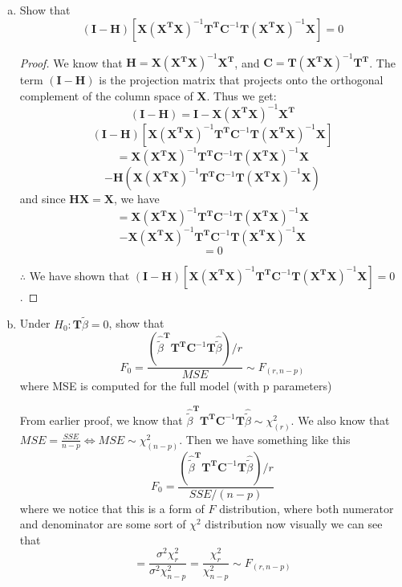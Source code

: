\documentclass[12pt]{article}
\newcommand{\X}{\mathbf{X}}
\newcommand{\btilde}{\tilde{\beta}}
\newcommand{\xtxinv}{(\X^{\T}\X)^{-1}}
\newcommand{\I}{\mathbf{I}}
\newcommand{\T}{\mathbf{T}}
\newcommand{\HM}{\mathbf{H}}
\begin{document}
\begin{enumerate}[1.]
\begin{enumerate}[a)]
\begin{proof}
                        $\therefore$ We have shown that 
                        $\hat{\btilde}^\T \T^\T \Sigma^{-1} \T \hat{\btilde} \sim \chi_{(\textbf{rank}(\textbf{T}))}^2 = \chi_{(r)}^2$.
                    \end{proof}
                    \item Show that 
                    \[(\I - \HM)[\X \xtxinv \T^\T \textbf{C}^{-1} \T \xtxinv \X] = 0\]

                    \begin{proof}
                        We know that $\HM = \X \xtxinv \X^\T$, and $\textbf{C} = \T (\X^\T \X)^{-1} \T^\T$. The term 
                        $(\I - \HM)$ is the projection matrix that projects onto 
                        the orthogonal complement of the column space of $\X$. Thus we get:
                        \[ (\I - \HM) = \I - \X \xtxinv \X^\T \]
                        \[ (\I - \HM)[\X \xtxinv \T^\T \textbf{C}^{-1} \T \xtxinv \X] \]
                        \[= \X \xtxinv \T^\T \textbf{C}^{-1} \T \xtxinv \X \]
                        \[- \HM (\X \xtxinv \T^\T \textbf{C}^{-1} \T \xtxinv \X)\]
                        and since $\HM\X = \X$, we have
                        \[= \X \xtxinv \T^\T \textbf{C}^{-1} \T \xtxinv \X \]
                        \[- \X \xtxinv \T^\T \textbf{C}^{-1} \T \xtxinv \X\]
                        \[= 0\]
                        
                        $\therefore$ We have shown that $(\I - \HM)[\X \xtxinv \T^\T \textbf{C}^{-1} \T \xtxinv \X] = 0$.
                    \end{proof}

                    \item Under $H_0: \T\btilde = 0$, show that 
                    \[F_0 = \frac{(\hat{\btilde}^\T \T^\T \textbf{C}^{-1} \T \hat{\btilde}) / r}{MSE} \sim F_{(r, n - p)}\] 
                    where MSE is computed for the full model (with p parameters)

                    From earlier proof, we know that $\hat{\btilde}^\T \T^\T \textbf{C}^{-1} \T \hat{\btilde} \sim \chi_{(r)}^2$.
                    We also know that $MSE = \frac{SSE}{n - p} \Leftrightarrow MSE \sim \chi^2_{(n - p)}$.
                    Then we have something like this
                    \[F_0 = \frac{(\hat{\btilde}^\T \T^\T \textbf{C}^{-1} \T \hat{\btilde}) / r}{SSE / (n - p)} \] 
                    where we notice that this is a form of $F$ distribution, 
                    where both numerator and denominator are some sort of $\chi^2$ distribution now visually we can see that
                    \[= \frac{\sigma^2 \chi^2_{r}}{\sigma^2 \chi^2_{n-p}} = \frac{\chi^2_{r}}{\chi^2_{n-p}} 
                    \sim F_{(r, n - p)}\]


\end{enumerate}
\end{enumerate}
\end{document}
